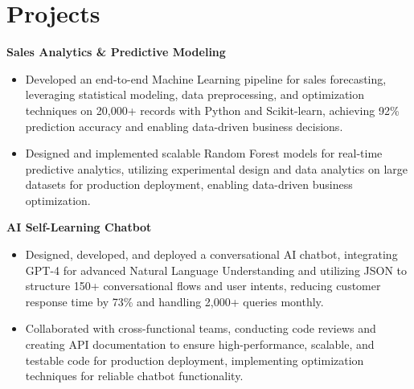 \documentclass[a4paper,10pt]{article}
\begin{document}
\vspace{-4mm}

\section*{Projects}
\textbf{Sales Analytics \& Predictive Modeling} \\
\begin{itemize}[leftmargin=*, itemsep=0pt, parsep=1pt]
\vspace{-7mm}
    \item Developed an end-to-end Machine Learning pipeline for sales forecasting, leveraging statistical modeling, data preprocessing, and optimization techniques on 20,000+ records with Python and Scikit-learn, achieving 92\% prediction accuracy and enabling data-driven business decisions.
    \item Designed and implemented scalable Random Forest models for real-time predictive analytics, utilizing experimental design and data analytics on large datasets for production deployment, enabling data-driven business optimization.
    \end{itemize}

\vspace{-2mm}
\textbf{AI Self-Learning Chatbot} \\
\begin{itemize}[leftmargin=*, itemsep=0pt, parsep=1pt]
\vspace{-7mm}
    \item Designed, developed, and deployed a conversational AI chatbot, integrating GPT-4 for advanced Natural Language Understanding and utilizing JSON to structure 150+ conversational flows and user intents, reducing customer response time by 73\% and handling 2,000+ queries monthly.
    \item Collaborated with cross-functional teams, conducting code reviews and creating API documentation to ensure high-performance, scalable, and testable code for production deployment, implementing optimization techniques for reliable chatbot functionality.
\end{itemize}
\end{document}
